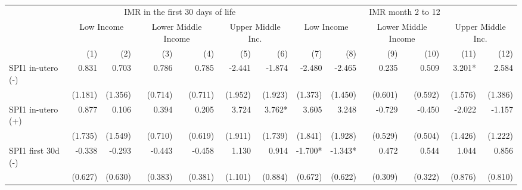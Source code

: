 \begin{table}[H]
\centering
\caption{}
\label{table2}
\begin{adjustbox}{max width=\linewidth}
\begin{tabular}{lrrrrrrrrrrrr}
    \toprule
                                                & \multicolumn{6}{c}{IMR in the first 30 days of life} & \multicolumn{6}{c}{IMR month 2 to 12} \\ 
    \cmidrule(lr){2-7} \cmidrule(lr){8-13} 
    & \multicolumn{2}{c}{Low Income} & \multicolumn{2}{c}{Lower Middle Income} & \multicolumn{2}{c}{Upper Middle Inc.}  & \multicolumn{2}{c}{Low Income} & \multicolumn{2}{c}{Lower Middle Income} & \multicolumn{2}{c}{Upper Middle Inc.} \\ 
    \cmidrule(lr){2-3} \cmidrule(lr){4-5} \cmidrule(lr){6-7} \cmidrule(lr){8-9} \cmidrule(lr){10-11} \cmidrule(lr){12-13} 
                                                &         (1) &         (2)  &         (3) &          (4) &          (5)  &         (6)  &         (7) &         (8)  &         (9)  &         (10)  &         (11)  &         (12)  \\ 
    \midrule
    SPI1 in-utero  (-)                          &       0.831 &       0.703 &        0.786 &       0.785  &      -2.441 &      -1.874  &   -2.480 &       -2.465  &        0.235 &        0.509 &       3.201* &        2.584\\ 
                                                &     (1.181) &     (1.356) &      (0.714) &     (0.711)  &     (1.952) &     (1.923)  &  (1.373) &      (1.450)  &      (0.601) &      (0.592) &      (1.576) &      (1.386)\\ 
    SPI1 in-utero  (+)                          &       0.877 &       0.106 &        0.394 &       0.205  &       3.724 &      3.762*  &    3.605 &        3.248  &       -0.729 &       -0.450 &       -2.022 &       -1.157\\ 
                                                &     (1.735) &     (1.549) &      (0.710) &     (0.619)  &     (1.911) &     (1.739)  &  (1.841) &      (1.928)  &      (0.529) &      (0.504) &      (1.426) &      (1.222)\\ 
    SPI1 first 30d  (-)                         &      -0.338 &      -0.293 &       -0.443 &      -0.458  &       1.130 &       0.914  &  -1.700* &      -1.343*  &        0.472 &        0.544 &        1.044 &        0.856\\ 
                                                &     (0.627) &     (0.630) &      (0.383) &     (0.381)  &     (1.101) &     (0.884)  &  (0.672) &      (0.622)  &      (0.309) &      (0.322) &      (0.876) &      (0.810)\\ 

\end{tabular}
\end{adjustbox}
\end{table}
